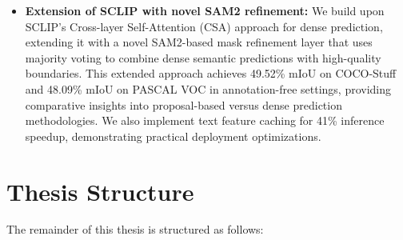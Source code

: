 \begin{itemize}
\item \textbf{Extension of SCLIP with novel SAM2 refinement:} We build upon SCLIP's \cite{sclip2024} Cross-layer Self-Attention (CSA) approach for dense prediction, extending it with a novel SAM2-based mask refinement layer that uses majority voting to combine dense semantic predictions with high-quality boundaries. This extended approach achieves 49.52\% mIoU on COCO-Stuff and 48.09\% mIoU on PASCAL VOC in annotation-free settings, providing comparative insights into proposal-based versus dense prediction methodologies. We also implement text feature caching for 41\% inference speedup, demonstrating practical deployment optimizations.
\end{itemize}

\section{Thesis Structure}

The remainder of this thesis is structured as follows:

